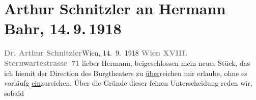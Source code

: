 

         
         \renewcommand{\erwaehntePersonen}{Personen: Leopold von Andrian-Werburg, Hermann Bahr, Clemens von Franckenstein, Robert Michel, Max von Millenkovich, Max Reinhardt}
         \renewcommand{\erwaehnteInstitutionen}{Institutionen: Burgtheater, Nationaltheater München}
         \renewcommand{\erwaehnteOrte}{Orte: München, Partenkirchen, Sternwartestraße 71, Wien}
         \renewcommand{\erwaehnteWerke}{Werke: Die Schwestern oder Casanova in Spa. Lustspiel in Versen}
               \section[Arthur Schnitzler an Hermann Bahr, 14. 9. 1918]{ Arthur Schnitzler an Hermann Bahr, 14. 9. 1918}\nopagebreak{}\rehead{ }\begin{ledgroupsized}[t]{13cm}\normalsize\beginnumbering \toendnotes[C]{\smallbreak\pagebreak[2]} 
\toendnotes[C]{\smallbreak}\pstart
           \textcolor{gray}{\textbf{{\pb}Dr. Arthur Schnitzler}}\hfill Wien, 14. 9. 1918\pend
           \pstart
           \textcolor{gray}{\textbf{Wien XVIII. Sternwartestrasse 71}}\pend
           \pstart
           lieber Hermann, beigeschlossen mein neues Stück, das ich hiemit der Direction des Burgtheaters zu \uline{über}reichen mir erlaube, ohne es vorläufg \uline{ein}zureichen. Über die Gründe dieser feinen Unterscheidung reden wir, sobald

\end{ledgroupsized}
